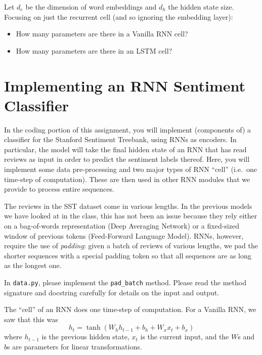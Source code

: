 \documentclass[11pt]{article}
\begin{document}
\vspace{2em}
  Let $d_e$ be the dimension of word embeddings and $d_h$ the hidden state size.  Focusing on just the recurrent cell (and so ignoring the embedding layer):
\begin{itemize}
  \item How many parameters are there in a Vanilla RNN cell?
  \item How many parameters are there in an LSTM cell?
\end{itemize}


\section{Implementing an RNN Sentiment Classifier}

In the coding portion of this assignment, you will implement (components of) a classifier for the Stanford Sentiment Treebank, using RNNs as encoders.  In particular, the model will take the final hidden state of an RNN that has read reviews as input in order to predict the sentiment labels thereof.  Here, you will implement some data pre-processing and two major types of RNN ``cell'' (i.e.\ one time-step of computation).  These are then used in other RNN modules that we provide to process entire sequences.

\vspace{2em}
 The reviews in the SST dataset come in various lengths.  In the previous models we have looked at in the class, this has not been an issue because they rely either on a bag-of-words representation (Deep Averaging Network) or a fixed-sized window of previous tokens (Feed-Forward Language Model).  RNNs, however, require the use of \emph{padding}: given a batch of reviews of various lengths, we pad the shorter sequences with a special padding token so that all sequences are as long as the longest one.

\noindent In \texttt{data.py}, please implement the \texttt{pad\_batch} method.  Please read the method signature and docstring carefully for details on the input and output.


\vspace{2em}
 The ``cell'' of an RNN does one time-step of computation.  For a Vanilla RNN, we saw that this was
\[ h_t = \tanh\left( W_h h_{t-1} + b_h + W_x x_t + b_x \right) \]
where $h_{t-1}$ is the previous hidden state, $x_t$ is the current input, and the $W$s and $b$s are parameters for linear transformations.
\end{document}
